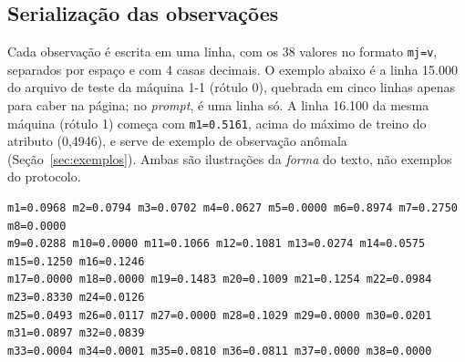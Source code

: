 \subsection{Serialização das observações}
Cada observação é escrita em uma linha, com os 38 valores no formato \texttt{mj=v}, separados por espaço e com
4 casas decimais. O exemplo abaixo é a linha 15.000 do arquivo de teste da máquina 1-1 (rótulo 0), quebrada em cinco linhas apenas para caber na página; no \emph{prompt}, é uma linha só. A linha 16.100 da mesma máquina
(rótulo 1) começa com \texttt{m1=0.5161}, acima do máximo de treino do atributo (0,4946), e serve de exemplo de
observação anômala (Seção~\ref{sec:exemplos}). Ambas são ilustrações da \emph{forma} do texto, não exemplos do
protocolo.
\begin{lstlisting}
m1=0.0968 m2=0.0794 m3=0.0702 m4=0.0627 m5=0.0000 m6=0.8974 m7=0.2750 m8=0.0000
m9=0.0288 m10=0.0000 m11=0.1066 m12=0.1081 m13=0.0274 m14=0.0575 m15=0.1250 m16=0.1246
m17=0.0000 m18=0.0000 m19=0.1483 m20=0.1009 m21=0.1254 m22=0.0984 m23=0.8330 m24=0.0126
m25=0.0493 m26=0.0117 m27=0.0000 m28=0.1029 m29=0.0000 m30=0.0201 m31=0.0897 m32=0.0839
m33=0.0004 m34=0.0001 m35=0.0810 m36=0.0811 m37=0.0000 m38=0.0000
\end{lstlisting}

